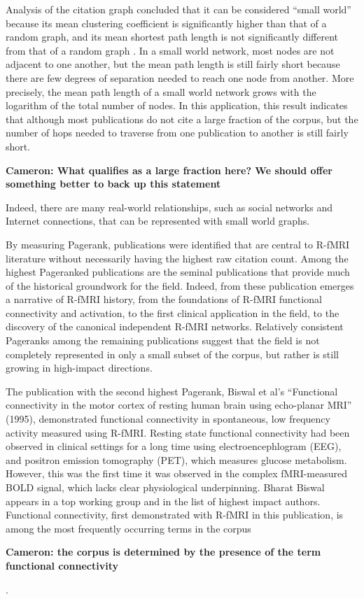 \documentclass[5p]{elsarticle}
\newcommand\MyCBox[1]{%
  \colorbox{yellow!60}{\begin{varwidth}{\dimexpr\linewidth-2\fboxsep}#1\end{varwidth}}}
\newcommand{\COMMENTCC}[1]{\MyCBox{\textcolor{cc_commentcolor}{\textbf{Cameron:
#1}}}}
\begin{document}
Analysis of the citation graph concluded that it can be considered ``small
world'' because its mean clustering coefficient is significantly higher
than that of a random graph, and its mean shortest path length is not
significantly different from that of a random graph \cite{Watts1998}. In a
small world network, most nodes are not adjacent to one another, but the
mean path length is still fairly short because there are few degrees of
separation needed to reach one node from another. More precisely, the mean
path length of a small world network grows with the logarithm of the total
number of nodes. In this application, this result indicates that although
most publications do not cite a large fraction of the corpus, but the
number of hops needed to traverse from one publication to another is still
fairly short. \COMMENTCC{What qualifies as a large fraction here? We
should offer something better to back up this statement} Indeed, there are
many real-world relationships, such as social networks and Internet
connections, that can be represented with small world graphs. 

By measuring Pagerank, publications were identified that are central to
R-fMRI literature without necessarily having the highest raw citation
count. Among the highest Pageranked publications are the seminal
publications that provide much of the historical groundwork for the field.
Indeed, from these publication emerges a narrative of R-fMRI history, from
the foundations of R-fMRI functional connectivity and activation, to the
first clinical application in the field, to the discovery of the canonical
independent R-fMRI networks.  Relatively consistent Pageranks among the
remaining publications suggest that the field is not completely
represented in only a small subset of the corpus, but rather is still
growing in high-impact directions. 

The publication with the second highest Pagerank, Biswal et al’s
``Functional connectivity in the motor cortex of resting human brain using
echo-planar MRI'' (1995)\cite{Biswal1995}, demonstrated functional
connectivity in spontaneous, low frequency activity measured using R-fMRI.
Resting state functional connectivity had been observed in clinical
settings for a long time using electroencephlogram (EEG), and positron
emission tomography (PET), which measures glucose metabolism. However,
this was the first time it was observed in the complex fMRI-measured BOLD
signal, which lacks clear physiological underpinning. Bharat Biswal
appears in a top working group and in the list of highest impact authors.
Functional connectivity, first demonstrated with R-fMRI in this
publication, is among the most frequently occurring terms in the corpus
\COMMENTCC{the corpus is determined by the presence of the term functional
connectivity}. 
\end{document}
